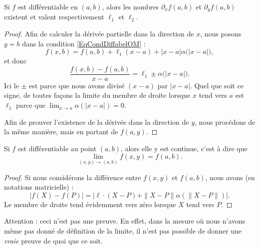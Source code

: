 \begin{proposition}
    Si $f$ est différentiable en $(a,b)$, alors les nombres $\partial_xf(a,b)$ et $\partial_yf(a,b)$ existent et valent respectivement $\ell_1$ et $\ell_2$.
\end{proposition}

\begin{proof}
    Afin de calculer la dérivée partielle dans la direction de $x$, nous posons $y=b$ dans la condition \eqref{EqCondDiffabelOM} :
    \begin{equation}
        f(x,b)=f(a,b)+\ell_1(x-a)+| x-a |\alpha\big( | x-a | \big),
    \end{equation}
    et donc
    \begin{equation}
        \frac{ f(x,b)-f(a,b) }{ x-a }=\ell_1\pm\alpha\big( | x-a | \big).
    \end{equation}
    Ici le $\pm$ est parce que nous avons divisé $(x-a)$ par $| x-a |$. Quel que soit ce signe, de toutes façons la limite du membre de droite lorsque $x$ tend vers $a$ est $\ell_1$ parce que $\lim_{x\to a} \alpha(| x-a |)=0$.

    Afin de prouver l'existence de la dérivée dans la direction de $y$, nous procédons de la même manière, mais en partant de $f(a,y)$.
\end{proof}

\begin{proposition}
    Si $f$ est différentiable au point $(a,b)$, alors elle y est continue, c'est à dire que
    \begin{equation}
        \lim_{(x,y)\to(a,b)}f(x,y)=f(a,b).
    \end{equation}
\end{proposition}

\begin{proof}
    Si nous considérons la différence entre $f(x,y)$ et $f(a,b)$, nous avons (en notations matricielle) :
    \begin{equation}
        | f(X)-f(P) |=| \ell\cdot(X-P)+\| X-P \|\alpha(\| X-P \|) |.
    \end{equation}
    Le membre de droite tend évidemment vers zéro lorsque $X$ tend vers $P$.
\end{proof}
    \begin{remark}
        Attention : ceci n'est pas une preuve. En effet, dans la mesure où nous n'avons même pas donné de définition de la limite, il n'est pas possible de donner une \emph{vraie} preuve de quoi que ce soit. 
    \end{remark}


